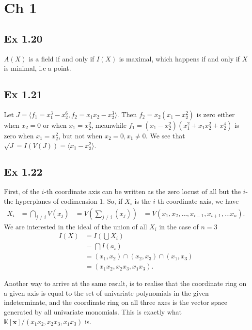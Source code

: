 \documentclass{article}
\theoremstyle{definition}
\newcommand{\K}{\mathbb{K}}
\newcommand{\Kx}{\K[\bm{x}]}
\begin{document}
\section*{Ch 1}

\subsection*{Ex 1.20}
$A(X)$ is a field if and only if $I(X)$ is maximal, which happens if and only
if $X$ is minimal, i.e a point.

\subsection*{Ex 1.21}
Let $J = \langle f_1 = x_1^{3} - x_2^{6}, f_2 = x_1x_2 - x_2^{3}\rangle$. Then
$f_2 = x_2(x_1 - x_2^{2})$ is zero either when $x_2 = 0$ or when $x_1 =
x_2^{2}$, meanwhile $f_1 = (x_1 - x_2^{2})(x_1^{2} + x_1x_2^{2} + x_2^{4})$ is
zero when $x_1 = x_2^{2}$, but not when $x_2 = 0, x_1 \not = 0$.
We see that $\sqrt{J} = I(V(J)) = \langle x_1 - x_2^{2} \rangle$.

\subsection*{Ex 1.22}
First, of the $i$-th coordinate axis can be written as the zero locust
of all but the $i$-the hyperplanes of codimension $1$. So, if $X_i$
is the $i$-th coordinate axis, we have
\begin{align*}
	X_i 
	&=
	\bigcap_{j \not = i} V(x_j)
	&=
	V\left(\sum_{j \not = i} (x_j)\right)
	&=
	V(x_1, x_2, \ldots, x_{i- 1}, x_{i + 1}, \ldots x_n).
\end{align*}
We are interested in the ideal of the union of all $X_i$ in the case of $n = 3$
\begin{align*}
	I(X)
	&=
	I\left(\bigcup X_i\right) \\
	&=
	\bigcap I(a_i) \\
	&=
	(x_1, x_2) \cap (x_2, x_3) \cap (x_1, x_3)\\
	&=
	(x_1x_2, x_2x_3, x_1x_3).
\end{align*} 

Another way to arrive at the same result, is to realise that the coordinate
ring on a given axis is equal to the set of univariate polynomials in the given
indeterminate, and the coordinate ring on all three axes is the vector space
generated by all univariate monomials. This is exactly what $\Kx / (x_1x_2,
x_2x_3, x_1x_3)$ is. \\
\end{document}
